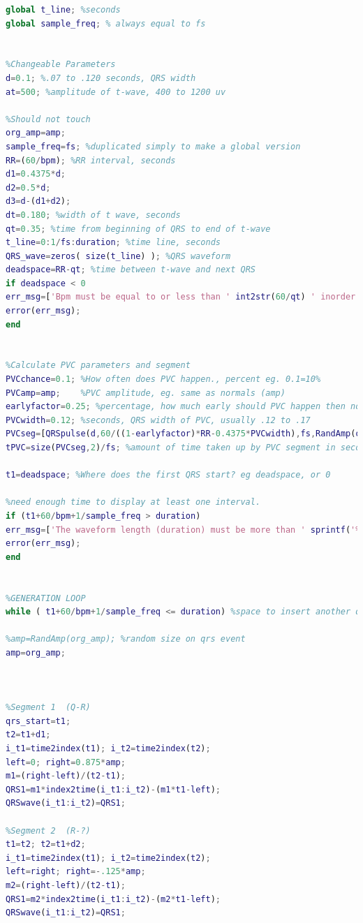 \begin{lstlisting}[language=Matlab]
global t_line; %seconds
global sample_freq; % always equal to fs


%Changeable Parameters
d=0.1; %.07 to .120 seconds, QRS width
at=500; %amplitude of t-wave, 400 to 1200 uv

%Should not touch
org_amp=amp;
sample_freq=fs; %duplicated simply to make a global version
RR=(60/bpm); %RR interval, seconds
d1=0.4375*d;
d2=0.5*d;
d3=d-(d1+d2);
dt=0.180; %width of t wave, seconds
qt=0.35; %time from beginning of QRS to end of t-wave
t_line=0:1/fs:duration; %time line, seconds
QRS_wave=zeros( size(t_line) ); %QRS waveform
deadspace=RR-qt; %time between t-wave and next QRS
if deadspace < 0 
err_msg=['Bpm must be equal to or less than ' int2str(60/qt) ' inorder to fit one cycle.'];
error(err_msg); 
end


%Calculate PVC parameters and segment
PVCchance=0.1; %How often does PVC happen., percent eg. 0.1=10%
PVCamp=amp;    %PVC amplitude, eg. same as normals (amp)
earlyfactor=0.25; %percentage, how much early should PVC happen then normal RR interval
PVCwidth=0.12; %seconds, QRS width of PVC, usually .12 to .17
PVCseg=[QRSpulse(d,60/((1-earlyfactor)*RR-0.4375*PVCwidth),fs,RandAmp(org_amp)) QRSpulse(PVCwidth,bpm*(1-earlyfactor),fs,PVCamp) QRSpulse(d,bpm,fs, RandAmp(org_amp))]; %PVC segment
tPVC=size(PVCseg,2)/fs; %amount of time taken up by PVC segment in seconds

t1=deadspace; %Where does the first QRS start? eg deadspace, or 0

%need enough time to display at least one interval.
if (t1+60/bpm+1/sample_freq > duration)
err_msg=['The waveform length (duration) must be more than ' sprintf('%.2f%',t1+60/bpm+1/sample_freq) ' second(s) in order to display one QRS event.'];
error(err_msg);
end


%GENERATION LOOP
while ( t1+60/bpm+1/sample_freq <= duration) %space to insert another qrs pulse in time line

%amp=RandAmp(org_amp); %random size on qrs event
amp=org_amp;



%Segment 1  (Q-R)
qrs_start=t1;   
t2=t1+d1;
i_t1=time2index(t1); i_t2=time2index(t2);
left=0; right=0.875*amp;
m1=(right-left)/(t2-t1);
QRS1=m1*index2time(i_t1:i_t2)-(m1*t1-left);
QRSwave(i_t1:i_t2)=QRS1;

%Segment 2  (R-?)
t1=t2; t2=t1+d2;
i_t1=time2index(t1); i_t2=time2index(t2);
left=right; right=-.125*amp;
m2=(right-left)/(t2-t1);
QRS1=m2*index2time(i_t1:i_t2)-(m2*t1-left);
QRSwave(i_t1:i_t2)=QRS1;



\end{lstlisting}

